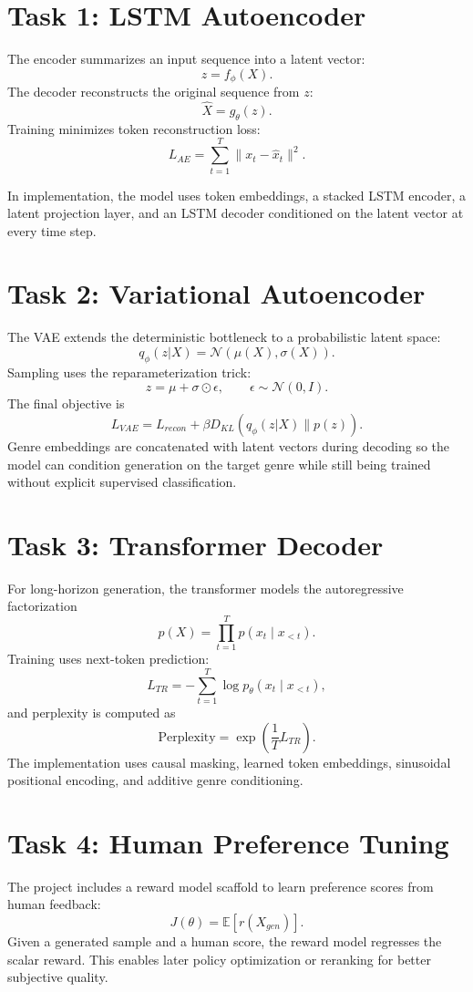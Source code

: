 \documentclass[11pt]{article}
\begin{document}
\section{Task 1: LSTM Autoencoder}
The encoder summarizes an input sequence into a latent vector:
\[
z = f_\phi(X).
\]
The decoder reconstructs the original sequence from $z$:
\[
\hat{X} = g_\theta(z).
\]
Training minimizes token reconstruction loss:
\[
L_{AE} = \sum_{t=1}^{T} \|x_t - \hat{x}_t\|^2.
\]

In implementation, the model uses token embeddings, a stacked LSTM encoder, a latent projection layer, and an LSTM decoder conditioned on the latent vector at every time step.

\section{Task 2: Variational Autoencoder}
The VAE extends the deterministic bottleneck to a probabilistic latent space:
\[
q_\phi(z|X) = \mathcal{N}(\mu(X), \sigma(X)).
\]
Sampling uses the reparameterization trick:
\[
z = \mu + \sigma \odot \epsilon, \qquad \epsilon \sim \mathcal{N}(0, I).
\]
The final objective is
\[
L_{VAE} = L_{recon} + \beta D_{KL}(q_\phi(z|X)\|p(z)).
\]
Genre embeddings are concatenated with latent vectors during decoding so the model can condition generation on the target genre while still being trained without explicit supervised classification.

\section{Task 3: Transformer Decoder}
For long-horizon generation, the transformer models the autoregressive factorization
\[
p(X) = \prod_{t=1}^{T} p(x_t \mid x_{<t}).
\]
Training uses next-token prediction:
\[
L_{TR} = -\sum_{t=1}^{T} \log p_\theta(x_t \mid x_{<t}),
\]
and perplexity is computed as
\[
\text{Perplexity} = \exp\left(\frac{1}{T}L_{TR}\right).
\]
The implementation uses causal masking, learned token embeddings, sinusoidal positional encoding, and additive genre conditioning.

\section{Task 4: Human Preference Tuning}
The project includes a reward model scaffold to learn preference scores from human feedback:
\[
J(\theta) = \mathbb{E}[r(X_{gen})].
\]
Given a generated sample and a human score, the reward model regresses the scalar reward. This enables later policy optimization or reranking for better subjective quality.
\end{document}
